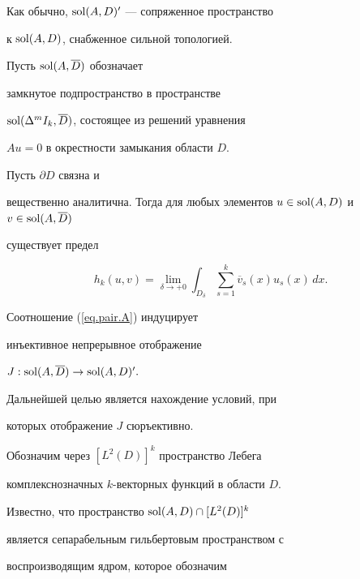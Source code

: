 Как обычно, $\operatorname{sol} (A, D)'$ --- сопряженное пространство


к $\operatorname{sol} (A, D)$, снабженное сильной топологией.


Пусть $\operatorname{sol} (A, \overline D)$ обозначает


замкнутое подпространство в пространстве


$\operatorname{sol} (\Delta ^m I_k, \overline D)$, состоящее из решений уравнения


$Au=0$ в окрестности замыкания области $D$.








\begin{cor} \label{c.pair}


Пусть $\partial D$ связна и


вещественно аналитична. Тогда для любых элементов $u \in


\sol (A,D)$ и $v \in \sol (A, \overline D)$


существует предел


\begin{equation} \label{eq.pair.A}


h_k (u,v) = \lim_{\delta \to +0}


\int_{D_\delta} \sum_{s=1}^k \overline {v}_s (x) u_s (x) \, dx.


\end{equation}


Соотношение (\ref{eq.pair.A}) индуцирует


инъективное непрерывное отображение


$J: \operatorname{sol} (A,\overline D) \to \operatorname{sol} (A, D)'.$


\end{cor}





Дальнейшей целью является нахождение условий, при


которых отображение $J$ сюръективно.





Обозначим через $[L^2 (D)]^k$ пространство Лебега


комплекснозначных $k$-векторных функций в области $D$.


Известно, что пространство $\operatorname{sol} (A,D)\cap [L^2 (D)]^k$


является сепарабельным гильбертовым пространством с


воспроизводящим ядром, которое обозначим


